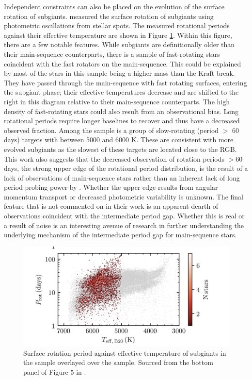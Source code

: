 Independent constraints can also be placed on the evolution of the surface rotation of subgiants.
\citet{santos_surface_2021} measured the surface rotation of  subgiants using photometric oscillations from stellar spots.
The measured rotational periods against their effective temperature are shown in Figure \ref{fig:subgiant_surface}.
Within this figure, there are a few notable features.
While subgiants are definitionally older than their main-sequence counterparts, there is a sample of fast-rotating stars coincident with the fast rotators on the main-sequence.
This could be explained by most of the stars in this sample being a higher mass than the Kraft break.
They have passed through the main-sequence with fast rotating surfaces, entering the subgiant phase; their effective temperatures decrease and are shifted to the right in this diagram relative to their main-sequence counterparts.
The high density of fast-rotating stars could also result from an observational bias.
Long rotational periods require longer baselines to recover and thus have a decreased observed fraction.
Among the sample is a group of slow-rotating (period $>$ 60 days) targets with \teff{} between 5000 and 6000 K.
These are consistent with more evolved subgiants as the slowest of these targets are located close to the RGB.
This work also suggests that the decreased observation of rotation periods $>$60 days, the strong upper edge of the \citet{mcquillan_rotation_2014} rotational period distribution, is the result of a lack of observations of main-sequence stars rather than an inherent lack of long period probing power by \kepler. 
Whether the upper edge results from angular momentum transport or decreased photometric variability is unknown.
The final feature that is not commented on in their work is an apparent dearth of observations coincident with the intermediate period gap.
Whether this is real or a result of noise is an interesting avenue of research in further understanding the underlying mechanism of the intermediate period gap for main-sequence stars.

\begin{figure}[h]
    \includegraphics[width=\textwidth]{Figures/intro_figures/subgiant_surface.png}
    \caption[Surface rotation period distribution of subgiant stars]{Surface rotation period against effective temperature of subgiants in the \citet{santos_surface_2021} sample overlayed over the \kepler{} \citet{mcquillan_rotation_2014} sample. 
    Sourced from the bottom panel of Figure 5 in \citet{santos_surface_2021}.}
    \label{fig:subgiant_surface}
\end{figure}

